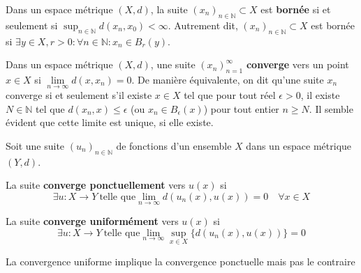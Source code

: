 \begin{definition}
    Dans un espace métrique $(X,d)$, la suite $(x_n)_{n\in\mathbb{N}}\subset X$ est \textbf{bornée} si et seulement si $\sup_{n\in\mathbb{N}}d(x_n,x_0)<\infty$. Autrement dit, $(x_n)_{n\in\mathbb{N}}\subset X$ est bornée si $\exists y \in X, r > 0 : \forall n \in \mathbb{N} : x_n \in B_r(y)$. 
\end{definition}

\begin{definition}
    Dans un espace métrique $(X,d)$, une suite $(x_n)_{n=1}^\infty$ \textbf{converge} vers un point $x\in X$ si $\lim \limits_{n\rightarrow\infty}d(x,x_n) = 0$. De manière équivalente, on dit qu'une suite $x_n$ converge si et seulement s'il existe $x\in X$ tel que pour tout réel $\epsilon>0$, il existe $N\in\mathbb{N}$ tel que $d(x_n,x) \leq \epsilon$ (ou $x_n \in B_\epsilon(x)$) pour tout entier $n\geq N$. Il semble évident que cette limite est unique, si elle existe.
\end{definition}

\begin{definition}
    Soit une suite $(u_n)_{n \in \mathbb{N}}$ de fonctions d’un ensemble $X$ dans un espace métrique $(Y, d)$.
    
    La suite \textbf{converge ponctuellement} vers $u(x)$ si
    \begin{equation*}
        \exists u : X \rightarrow Y \ \text{telle que} \lim \limits_{n\to\infty} d(u_n(x), u(x)) = 0 \quad \forall x \in X
    \end{equation*}
    
    
    La suite \textbf{converge uniformément} vers $u(x)$ si
    \begin{equation*}
        \exists u : X \rightarrow Y \ \text{telle que} \lim \limits_{n\to\infty} \sup \limits_{x \in X} \{d(u_n(x), u(x))\} = 0
    \end{equation*}
    
    La convergence uniforme implique la convergence ponctuelle mais pas le contraire
\end{definition}

\noindent
{}\\

